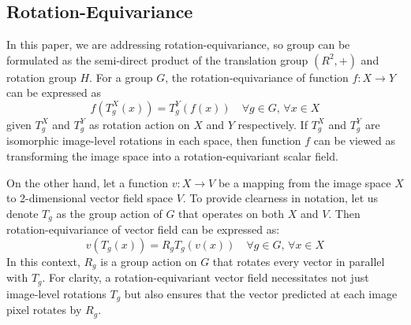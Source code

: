 \documentclass[letterpaper]{article} %
\begin{document}
\subsection{Rotation-Equivariance} 
In this paper, we are addressing rotation-equivariance, so group can be formulated as the semi-direct product of the translation group \( (R^2, +) \) and rotation group \( H \). For a group \(G\), the rotation-equivariance of function \(f: X \to Y\) can be expressed as
\begin{equation}
     f\left(T^X_g(x)\right) = T^Y_g\left(f(x)\right)  \quad \forall g \in G ,\, \forall x \in X
\end{equation}
 given \(T^X_g\) and \(T^Y_g\) as rotation action on \(X\) and \(Y\) respectively. If \(T^X_g\) and \(T^Y_g\) are isomorphic image-level rotations in each space, then function \(f\) can be viewed as transforming the image space into a rotation-equivariant scalar field.
 
On the other hand, let a function \(v: X \to V\) be a mapping from the image space \(X\) to 2-dimensional vector field space \(V\). To provide clearness in notation,  let us denote \(T_g\)  as the group action of \(G\) that operates on both \(X\) and \(V\). Then rotation-equivariance of vector field can be expressed as:
\begin{equation}
     v\left(T_g(x)\right) = R_g T_g\left(v(x)\right)  \quad \forall g \in G ,\, \forall x \in X
\end{equation}
In this context, \(R_g\) is a group action on \(G\) that rotates every vector in parallel with \(T_g\). For clarity, a rotation-equivariant vector field necessitates not just image-level rotations \(T_g\) but also ensures that the vector predicted at each image pixel rotates by \(R_g\).
 

\end{document}
